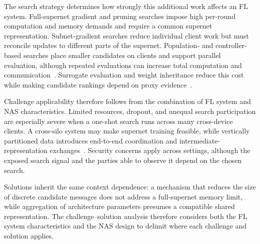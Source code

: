 The search strategy determines how strongly this additional work affects an FL system. Full-supernet gradient and pruning searches impose high per-round computation and memory demands and require a common supernet representation. Subnet-gradient searches reduce individual client work but must reconcile updates to different parts of the supernet. Population- and controller-based searches place smaller candidates on clients and support parallel evaluation, although repeated evaluations can increase total computation and communication~\cite{nas_in_fl_2026}. Surrogate evaluation and weight inheritance reduce this cost while making candidate rankings depend on proxy evidence~\cite{nas_1000_papers_2023,nas_in_fl_2026}.

Challenge applicability therefore follows from the combination of FL system and NAS characteristics. Limited resources, dropout, and unequal search participation are especially severe when a one-shot search runs across many cross-device clients. A cross-silo system may make supernet training feasible, while vertically partitioned data introduces end-to-end coordination and intermediate-representation exchanges~\cite{fl_advances_and_open_problems_2021,nas_in_fl_2026}. Security concerns apply across settings, although the exposed search signal and the parties able to observe it depend on the chosen search.

Solutions inherit the same context dependence: a mechanism that reduces the size of discrete candidate messages does not address a full-supernet memory limit, while aggregation of architecture parameters presumes a compatible shared representation. The challenge--solution analysis therefore considers both the FL system characteristics and the NAS design to delimit where each challenge and solution applies.